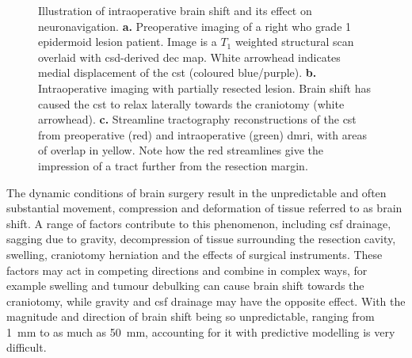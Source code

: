 \begin{SCfigure}[][hp!]
  
  \caption[Intraoperative brain shift]{Illustration of intraoperative brain shift and its effect on neuronavigation.
  \textbf{\sffamily a.} Preoperative imaging of a right \gls{who} grade 1 epidermoid lesion patient. Image is a $T_1$ weighted structural scan overlaid with \gls{csd}-derived \gls{dec} map. White arrowhead indicates medial displacement of the \gls{cst} (coloured blue/purple).
  \textbf{\sffamily b.} Intraoperative imaging with partially resected lesion. Brain shift has caused the \gls{cst} to relax laterally towards the craniotomy (white arrowhead).
  \textbf{\sffamily c.} Streamline tractography reconstructions of the \gls{cst} from preoperative (red) and intraoperative (green) \gls{dmri}, with areas of overlap in yellow. Note how the red streamlines give the impression of a tract further from the resection margin.}
  \label{fig:shift}
\end{SCfigure}

The dynamic conditions of brain surgery result in the unpredictable and often substantial movement, compression and deformation of tissue referred to as brain shift.
A range of factors contribute to this phenomenon, including \gls{csf} drainage, sagging due to gravity, decompression of tissue surrounding the resection cavity, swelling, craniotomy herniation and the effects of surgical instruments\autocite{Gerard2017}.
These factors may act in competing directions and combine in complex ways, for example swelling and tumour debulking can cause brain shift towards the craniotomy, while gravity and \gls{csf} drainage may have the opposite effect\autocite{Roberts1998}.
With the magnitude and direction of brain shift being so unpredictable, ranging from 1~mm to as much as 50~mm\autocite{Gerard2017}, accounting for it with predictive modelling is very difficult\autocite{Bayer2017b}.

